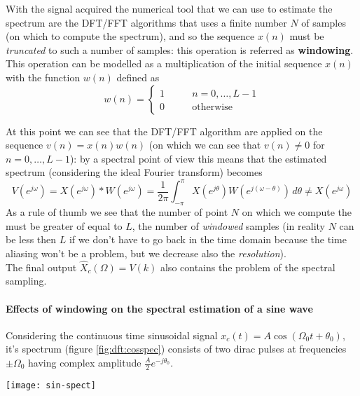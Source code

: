 	With the signal acquired the numerical tool that we can use to estimate the spectrum are the DFT/FFT algorithms that uses a finite number $N$ of samples (on which to compute the spectrum), and so the sequence $x(n)$ must be \textit{truncated} to such a number of samples: this operation is referred as \textbf{windowing}. This operation can be modelled as a multiplication of the initial sequence $x(n)$ with the function $w(n)$ defined as
	\[ w(n) = \begin{cases}
		1 \qquad& n=0,\dots,L-1 \\ 0 & \textrm{otherwise}
	\end{cases} \]

	At this point we can see that the DFT/FFT algorithm are applied on the sequence $v(n) = x(n)w(n)$ (on which we can see that $v(n) \neq 0$ for $n = 0,\dots, L-1$): by a spectral point of view this means that the estimated spectrum (considering the ideal Fourier transform) becomes
	\[ V(e^{j\omega}) = X(e^{j\omega}) * W(e^{j\omega}) = \frac 1{2\pi} \int_{-\pi}^\pi X(e^{j\theta}) W(e^{j(\omega-\theta)}) \, d\theta \neq X(e^{j\omega}) \]
	As a rule of thumb we see that the number of point $N$ on which we compute the \dft must be greater of equal to $L$, the number of \textit{windowed} samples (in reality $N$ can be less then $L$ if we don't have to go back in the time domain because the time aliasing won't be a problem, but we decrease also the \textit{resolution}).\\
	The final output $\hat X_c(\Omega) = V(k)$ also contains the problem of the spectral sampling.

	\paragraph{Effects of windowing on the spectral estimation of a sine wave} Considering the continuous time sinusoidal signal $x_c(t) = A \cos(\Omega_0t + \theta_0)$, it's spectrum (figure \ref{fig:dft:cosspec}) consists of two dirac pulses at frequencies $\pm\Omega_0$ having complex amplitude $\frac  A2 e^{-j\theta_0}$.
		
	\begin{SCfigure}[2][bht]
		\centering \texttt{[image: sin-spect]}
		\caption{magnitude spectrum of the signal $A \cos(\Omega_0t+\theta_0)$.}
		\label{fig:dft:cosspec}
	\end{SCfigure}

